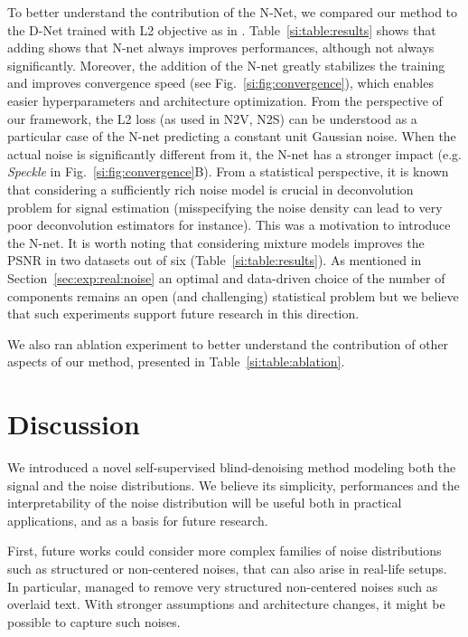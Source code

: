 \documentclass{article}
\begin{document}
To better understand the contribution of the N-Net, we compared our method to the D-Net trained with L2 objective as in \cite{batson2019noise2self, krull2018noise2void}. Table~\ref{si:table:results} shows that adding shows that N-net always improves performances, although not always significantly. Moreover, the addition of the N-net greatly stabilizes the training and improves convergence speed (see Fig.~\ref{si:fig:convergence}), which enables easier hyperparameters and architecture optimization.
From the perspective of our framework, the L2 loss (as used in N2V, N2S) can be understood as a particular case of the N-net predicting a constant unit Gaussian noise. When the actual noise is significantly different from it, the N-net has a stronger impact (e.g. \textit{Speckle} in Fig.~\ref{si:fig:convergence}B).
From a statistical perspective, it is known that considering a sufficiently rich noise model is crucial in deconvolution problem for signal estimation (misspecifying the noise density can lead to very poor deconvolution estimators for instance). This was a motivation to introduce the N-net.
It is worth noting that considering mixture models improves the PSNR in two datasets out of six (Table~\ref{si:table:results}).
As mentioned in Section~\ref{sec:exp:real:noise} an optimal and data-driven choice of the number of components remains an open (and challenging) statistical problem but we believe that such experiments support future research in this direction.

We also ran ablation experiment to better understand the contribution of other aspects of our method, presented in Table~\ref{si:table:ablation}.

\section{Discussion}
\label{sec:discussion}
We introduced a novel self-supervised blind-denoising method modeling both the signal and the noise distributions. We believe its simplicity, performances and the interpretability of the noise distribution will be useful both in practical applications, and as a basis for future research.

First, future works could consider more complex families of noise distributions such as structured or non-centered noises, that can also arise in real-life setups. In particular, \cite{lehtinen2018noise2noise} managed to remove very structured non-centered noises such as overlaid text. With stronger assumptions and architecture changes, it might be possible to capture such noises.
\end{document}
